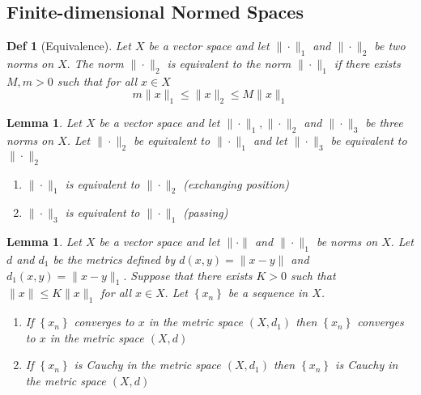 \documentclass[10pt]{paper}
\newtheorem{definition}{Def}[section]
\newtheorem{lemma}[theorem]{Lemma}
\begin{document}
\subsection{Finite-dimensional Normed Spaces}
\begin{definition}[Equivalence]
    Let $X$ be a vector space and let $\|\cdot\|_{1}$ and $\|\cdot\|_{2}$ be two norms on $X .$ The norm $\|\cdot\|_{2}$ is equivalent to the norm $\|\cdot\|_{1}$ if there exists $M, m>0$ such that for all $x \in X$
    $$
        m\|x\|_{1} \leq\|x\|_{2} \leq M\|x\|_{1}
    $$
\end{definition}

\begin{lemma}
    Let $X$ be a vector space and let $\|\cdot\|_{1},\|\cdot\|_{2}$ and $\|\cdot\|_{3}$ be three norms on $X$. Let $\|\cdot\|_{2}$ be equivalent to $\|\cdot\|_{1}$ and let $\|\cdot\|_{3}$ be equivalent to $\|\cdot\|_{2}$
    \begin{enumerate}
        \item $\|\cdot\|_{1}$ is equivalent to $\|\cdot\|_{2}$ (exchanging position)
        \item $\|\cdot\|_{3}$ is equivalent to $\|\cdot\|_{1}$ (passing)
    \end{enumerate}
\end{lemma}

\begin{lemma}
    Let $X$ be a vector space and let $\|\cdot\|$ and $\|\cdot\|_{1}$ be norms on $X .$ Let $d$ and $d_{1}$ be the metrics defined by $d(x, y)=\|x-y\|$ and $d_{1}(x, y)=\|x-y\|_{1} .$ Suppose that there exists $K>0$ such that $\|x\| \leq K\|x\|_{1}$ for all $x \in X .$ Let $\left\{x_{n}\right\}$ be a sequence in $X$.
    \begin{enumerate}
        \item If $\left\{x_{n}\right\}$ converges to $x$ in the metric space $\left(X, d_{1}\right)$ then $\left\{x_{n}\right\}$ converges to $x$ in the metric space $(X, d)$
        \item If $\left\{x_{n}\right\}$ is Cauchy in the metric space $\left(X, d_{1}\right)$ then $\left\{x_{n}\right\}$ is Cauchy in the metric space $(X, d)$
    \end{enumerate}
\end{lemma}
\end{document}
